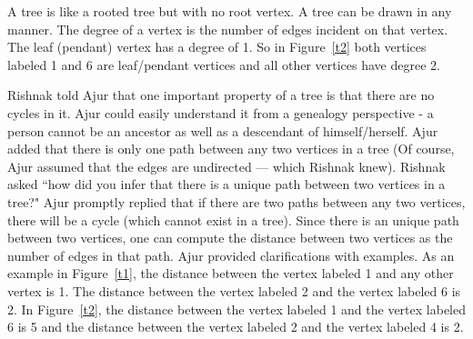 A tree is like a rooted tree but with no root vertex. A tree can be drawn in any manner. The degree of a vertex is the number of edges incident on that vertex. The leaf (pendant) vertex has a degree of 1. So in Figure~\ref{t2} both vertices labeled 1 and 6 are leaf/pendant vertices and all other vertices have degree 2. 

Rishnak told Ajur that one important property of a tree is that there are no cycles in it. Ajur could easily understand it from a genealogy perspective - a person cannot be an ancestor as well as a descendant of himself/herself.  Ajur added that there is only one path between any two vertices in a tree (Of course, Ajur assumed that the edges are undirected --- which Rishnak knew). Rishnak asked ``how did you infer that there is a unique path between two vertices in a tree?" Ajur promptly replied that if there are two paths between any two vertices, there will be a cycle (which cannot exist in a tree). Since there is an unique path between two vertices, one can compute the distance between two vertices as the number of edges in that path. Ajur provided clarifications with examples.  As an example in Figure~\ref{t1}, the distance between the vertex labeled 1 and any other vertex is 1. The distance between the vertex labeled 2 and the vertex labeled 6 is 2. In Figure~\ref{t2}, the distance between the vertex labeled 1 and the vertex labeled 6 is 5 and the distance between the vertex labeled 2 and the vertex labeled 4 is 2.
